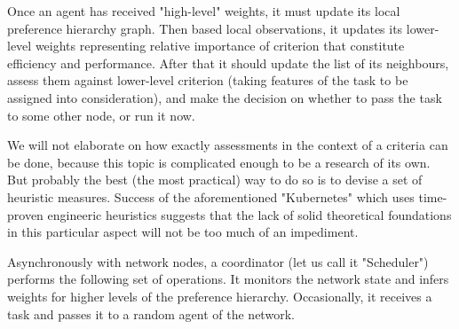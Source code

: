 Once an agent has received "high-level" weights, it must update its local preference hierarchy graph.
Then based local observations, it updates its lower-level weights representing relative importance of criterion that constitute efficiency and performance.
After that it should update the list of its neighbours, assess them against lower-level criterion (taking features of the task to be assigned into consideration), and make the decision on whether to pass the task to some other node, or run it now.

We will not elaborate on how exactly assessments in the context of a criteria can be done, because this topic is complicated enough to be a research of its own.
But probably the best (the most practical) way to do so is to devise a set of heuristic measures.
Success of the aforementioned "Kubernetes" which uses time-proven engineeric heuristics suggests that the lack of solid theoretical foundations in this particular aspect will not be too much of an impediment.


Asynchronously with network nodes, a coordinator (let us call it "Scheduler") performs the following set of operations. It monitors the network state and infers weights for higher levels of the preference hierarchy. Occasionally, it receives a task and passes it to a random agent of the network.
